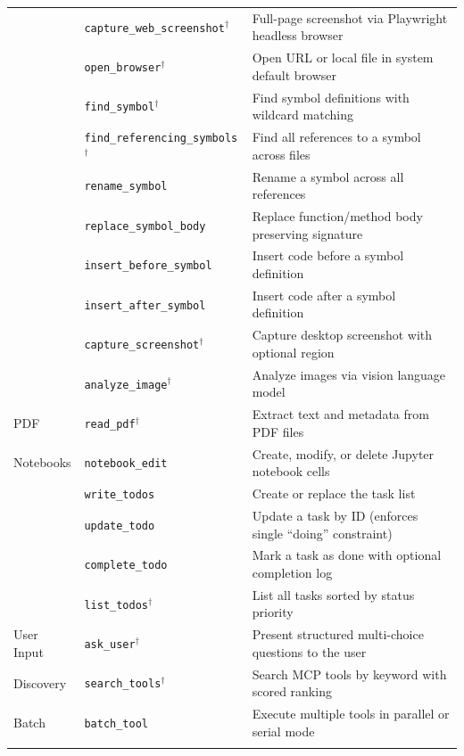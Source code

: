 \begin{table}[h]
\begin{tabular}{@{}llp{4.8cm}@{}}
& \texttt{capture\_web\_screenshot}$^\dagger$ & Full-page screenshot via Playwright headless browser \\
& \texttt{open\_browser}$^\dagger$ & Open URL or local file in system default browser \\
\addlinespace
\multirow{6}{*}{Symbols (LSP)}
& \texttt{find\_symbol}$^\dagger$ & Find symbol definitions with wildcard matching \\
& \texttt{find\_referencing\_symbols}$^\dagger$ & Find all references to a symbol across files \\
& \texttt{rename\_symbol} & Rename a symbol across all references \\
& \texttt{replace\_symbol\_body} & Replace function/method body preserving signature \\
& \texttt{insert\_before\_symbol} & Insert code before a symbol definition \\
& \texttt{insert\_after\_symbol} & Insert code after a symbol definition \\
\addlinespace
\multirow{2}{*}{Visual}
& \texttt{capture\_screenshot}$^\dagger$ & Capture desktop screenshot with optional region \\
& \texttt{analyze\_image}$^\dagger$ & Analyze images via vision language model \\
\addlinespace
PDF & \texttt{read\_pdf}$^\dagger$ & Extract text and metadata from PDF files \\
\addlinespace
Notebooks & \texttt{notebook\_edit} & Create, modify, or delete Jupyter notebook cells \\
\addlinespace
\multirow{4}{*}{Task Mgmt}
& \texttt{write\_todos} & Create or replace the task list \\
& \texttt{update\_todo} & Update a task by ID (enforces single ``doing'' constraint) \\
& \texttt{complete\_todo} & Mark a task as done with optional completion log \\
& \texttt{list\_todos}$^\dagger$ & List all tasks sorted by status priority \\
\addlinespace
User Input & \texttt{ask\_user}$^\dagger$ & Present structured multi-choice questions to the user \\
\addlinespace
Discovery & \texttt{search\_tools}$^\dagger$ & Search MCP tools by keyword with scored ranking \\
\addlinespace
Batch & \texttt{batch\_tool} & Execute multiple tools in parallel or serial mode \\
\addlinespace
\multirow{2}{*}{Subagents}

\end{tabular}
\end{table}
